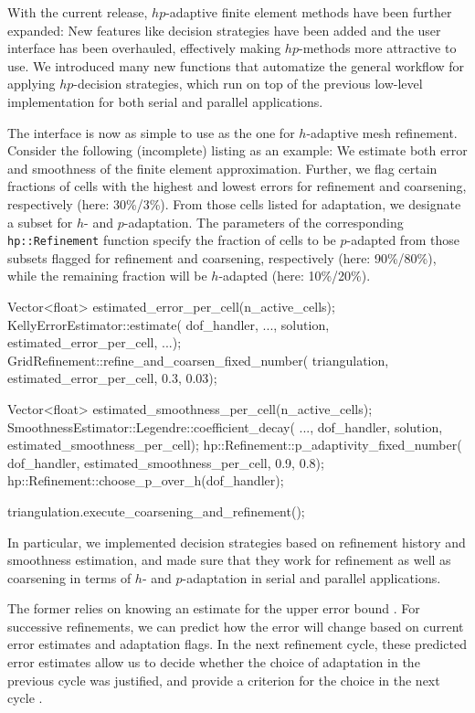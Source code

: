 \documentclass{ansarticle-preprint}
\begin{document}
With the current release, $hp$-adaptive finite element methods have been further
expanded: New features like decision strategies have been added and the user interface
has been overhauled, effectively making $hp$-methods more attractive to use. We introduced
many new functions that automatize the general workflow for applying $hp$-decision
strategies, which run on top of the previous low-level implementation for both serial
and parallel applications.

The interface is now as simple to use as the one for $h$-adaptive mesh refinement.
Consider the following (incomplete) listing as an example: We estimate both error and
smoothness of the finite element approximation. Further, we flag certain fractions of
cells with the highest and lowest errors for refinement and coarsening, respectively
(here: 30\%/3\%). From those cells listed for adaptation, we designate a subset
for $h$- and $p$-adaptation. The parameters of the corresponding
\texttt{hp::Refinement} function specify the fraction of cells to be $p$-adapted from
those subsets flagged for refinement and coarsening, respectively (here: 90\%/80\%),
while the remaining fraction will be $h$-adapted (here: 10\%/20\%).
\begin{c++}
Vector<float> estimated_error_per_cell(n_active_cells);
KellyErrorEstimator::estimate(
  dof_handler, ..., solution, estimated_error_per_cell, ...);
GridRefinement::refine_and_coarsen_fixed_number(
  triangulation, estimated_error_per_cell, 0.3, 0.03);

Vector<float> estimated_smoothness_per_cell(n_active_cells);
SmoothnessEstimator::Legendre::coefficient_decay(
  ..., dof_handler, solution, estimated_smoothness_per_cell);
hp::Refinement::p_adaptivity_fixed_number(
  dof_handler, estimated_smoothness_per_cell, 0.9, 0.8);
hp::Refinement::choose_p_over_h(dof_handler);

triangulation.execute_coarsening_and_refinement();
\end{c++}

In particular, we implemented decision strategies based on refinement history and
smoothness estimation, and made sure that they work for refinement as well as
coarsening in terms of $h$- and $p$-adaptation in serial and parallel applications.

The former relies on knowing an estimate for the upper error bound \cite[Thm.~3.4]{BabuskaSuri1990}.
For successive refinements, we can predict how the error will change based on
current error estimates and adaptation flags. In the next refinement cycle, these
predicted error estimates allow us to decide whether the choice of adaptation in
the previous cycle was justified, and provide a criterion for the choice in the next
cycle \cite{MelenkWohlmuth2001}.
\end{document}
